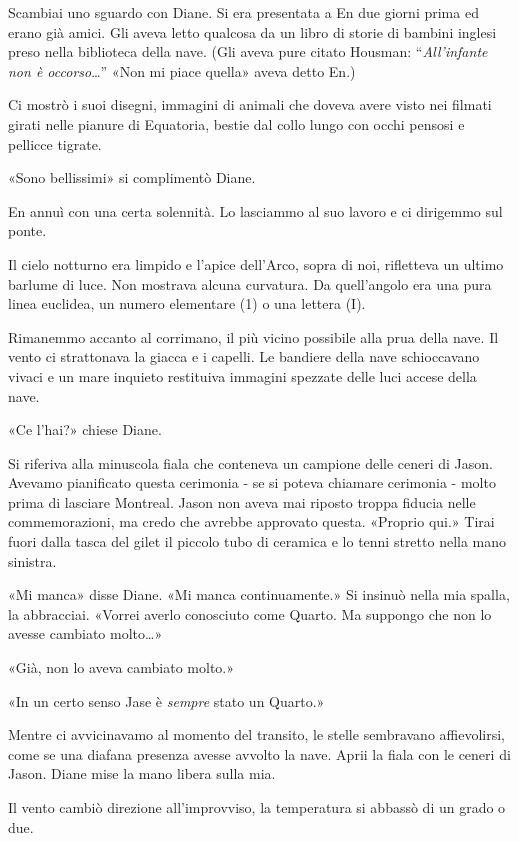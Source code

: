 Scambiai uno sguardo con Diane. Si era presentata a En due giorni prima
ed erano già amici. Gli aveva letto qualcosa da un libro di storie di
bambini inglesi preso nella biblioteca della nave. (Gli aveva pure
citato Housman: ``\emph{All'infante non è occorso}\ldots'' «Non mi piace
quella» aveva detto En.)

Ci mostrò i suoi disegni, immagini di animali che doveva avere visto nei
filmati girati nelle pianure di Equatoria, bestie dal collo lungo con
occhi pensosi e pellicce tigrate.

«Sono bellissimi» si complimentò Diane.

En annuì con una certa solennità. Lo lasciammo al suo lavoro e ci
dirigemmo sul ponte.

\separatorefiori

Il cielo notturno era limpido e l'apice dell'Arco, sopra di noi,
rifletteva un ultimo barlume di luce. Non mostrava alcuna curvatura. Da
quell'angolo era una pura linea euclidea, un numero elementare (1) o una
lettera (I).

Rimanemmo accanto al corrimano, il più vicino possibile alla prua della
nave. Il vento ci strattonava la giacca e i capelli. Le bandiere della
nave schioccavano vivaci e un mare inquieto restituiva immagini spezzate
delle luci accese della nave.

«Ce l'hai?» chiese Diane.

Si riferiva alla minuscola fiala che conteneva un campione delle ceneri
di Jason. Avevamo pianificato questa cerimonia - se si poteva chiamare
cerimonia - molto prima di lasciare Montreal. Jason non aveva mai
riposto troppa fiducia nelle commemorazioni, ma credo che avrebbe
approvato questa. «Proprio qui.» Tirai fuori dalla tasca del gilet il
piccolo tubo di ceramica e lo tenni stretto nella mano sinistra.

«Mi manca» disse Diane. «Mi manca continuamente.» Si insinuò nella mia
spalla, la abbracciai. «Vorrei averlo conosciuto come Quarto. Ma
suppongo che non lo avesse cambiato molto\ldots»

«Già, non lo aveva cambiato molto.»

«In un certo senso Jase è \emph{sempre} stato un Quarto.»

Mentre ci avvicinavamo al momento del transito, le stelle sembravano
affievolirsi, come se una diafana presenza avesse avvolto la nave. Aprii
la fiala con le ceneri di Jason. Diane mise la mano libera sulla mia.

Il vento cambiò direzione all'improvviso, la temperatura si abbassò di
un grado o due.

